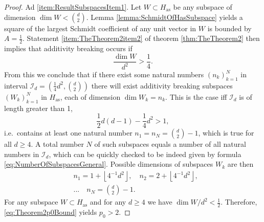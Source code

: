 \documentclass[reqno]{amsart}
\theoremstyle{plain}
\theoremstyle{note}
\newcommand{\floor}[1]{\left\lfloor #1 \right\rfloor}
\newcommand{\aspace}{H_{\mathrm{as}}}
\begin{document}
\begin{proof}
Ad \ref{item:ResultSubspacesItem1}. Let $W \subset \aspace$ be any subspace of dimension $\dim{W} < \binom{d}{2}$. Lemma \ref{lemma:SchmidtOfHasSubspace} yields a square of the largest Schmidt coefficient of any unit vector in $W$ is bounded by $A = \frac{1}{2}$. Statement \ref{item:TheTheorem2item2} of theorem \ref{thm:TheTheorem2} then implies that additivity breaking occurs if
\begin{equation}\label{eq:Subspaces}
    \frac{\dim{W}}{d^2} > \frac{1}{4}.
\end{equation}
From this we conclude that if there exist some natural numbers $(n_k)_{k=1}^{N}$ in interval $\mathcal{I}_d = \left(\frac{1}{4}d^2 , \binom{d}{2}\right)$ there will exist additivity breaking subspaces $(W_{k})_{k=1}^{N}$ in $\aspace$, each of dimension $\dim{W_k} = n_k$. This is the case iff $\mathcal{I}_d$ is of length greater than 1,
\begin{equation}
    \frac{1}{2}d(d-1) - \frac{1}{4}d^2 > 1,
\end{equation}
i.e.~contains at least one natural number $n_1 = n_N = \binom{d}{2}-1$, which is true for all $d \geqslant 4$. A total number $N$ of such subspaces equals a number of all natural numbers in $\mathcal{I}_d$, which can be quickly checked to be indeed given by formula \eqref{eq:NumberOfSubspacesGeneral}. Possible dimensions of subspaces $W_k$ are then
\begin{align}
    &n_1 = 1+\floor{4^{-1}d^2}, \quad n_2 = 2+\floor{4^{-1}d^2}, \\
    &... \quad n_N = \binom{d}{2}-1.\nonumber
\end{align}
For any subspace $W\subset\aspace$ and for any $d \geqslant 4$ we have $\dim{W}/d^{2} < \frac{1}{2}$. Therefore, \eqref{eq:Theorem2p0Bound} yields $p_0 > 2$.


\end{proof}
\end{document}
